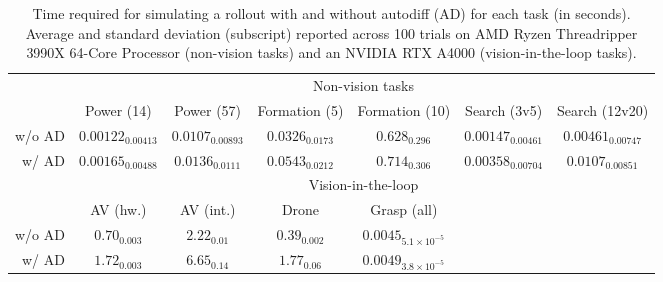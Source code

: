 \begin{table}
    \caption{Time required for simulating a rollout with and without autodiff (AD) for each task (in seconds). Average and standard deviation (subscript) reported across 100 trials on AMD Ryzen Threadripper 3990X 64-Core Processor (non-vision tasks) and an NVIDIA RTX A4000 (vision-in-the-loop tasks).}
    \label{ch:corl:tab:runtime}
    \centering
    \scriptsize
    \begin{tabular}{rcccccc}
        \toprule
        \multicolumn{1}{l}{} & \multicolumn{6}{c}{Non-vision tasks}                                                                                                                       \\
        \cmidrule(r){2-7}
                             & Power (14)                             & Power (57)         & Formation (5)     & Formation (10)               & Search (3v5)        & Search (12v20)      \\
        \midrule
        w/o AD               & $0.00122_{0.00413}$                    & $0.0107_{0.00893}$ & $0.0326_{0.0173}$ & $0.628_{0.296}$              & $0.00147_{0.00461}$ & $0.00461_{0.00747}$ \\
        w/ AD                & $0.00165_{0.00488}$                    & $0.0136_{0.0111}$  & $0.0543_{0.0212}$ & $0.714_{0.306}$              & $0.00358_{0.00704}$ & $0.0107_{0.00851}$  \\
        \midrule
        \multicolumn{1}{l}{} & \multicolumn{6}{c}{Vision-in-the-loop}                                                                                                                     \\
        \cmidrule(r){2-7}
                             & AV (hw.)                               & AV (int.)          & Drone             & Grasp (all)                  &                     &                     \\
        \midrule
        w/o AD               & $0.70_{0.003}$                         & $2.22_{0.01}$      & $0.39_{0.002}$    & $0.0045_{5.1\times 10^{-5}}$ &                                           \\
        w/ AD                & $1.72_{0.003}$                         & $6.65_{0.14}$      & $1.77_{0.06}$     & $0.0049_{3.8\times 10^{-5}}$ &                                           \\
        \bottomrule
    \end{tabular}
\end{table}

